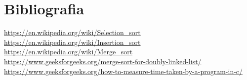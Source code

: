 \documentclass[]{article}
\begin{document}
\section{Bibliografia}
\url{https://en.wikipedia.org/wiki/Selection_sort}\\
\url{https://en.wikipedia.org/wiki/Insertion_sort}\\
\url{https://en.wikipedia.org/wiki/Merge_sort}\\
\url{https://www.geeksforgeeks.org/merge-sort-for-doubly-linked-list/}\\
\url{https://www.geeksforgeeks.org/how-to-measure-time-taken-by-a-program-in-c/}\\
\end{document}
